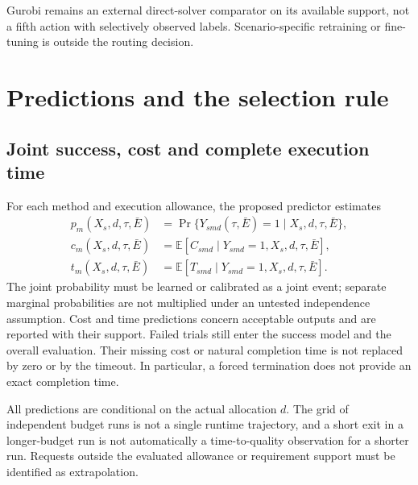 Gurobi remains an external direct-solver comparator on its available support,
not a fifth action with selectively observed labels. Scenario-specific
retraining or fine-tuning is outside the routing decision.

\section{Predictions and the selection rule}
\subsection{Joint success, cost and complete execution time}
For each method and execution allowance, the proposed predictor estimates
\begin{align}
 p_m(X_s,d,\tau,\bar E)
 &=\Pr\{Y_{smd}(\tau,\bar E)=1\mid X_s,d,\tau,\bar E\},\\
 c_m(X_s,d,\tau,\bar E)
 &=\mathbb E[C_{smd}\mid Y_{smd}=1,X_s,d,\tau,\bar E],\\
 t_m(X_s,d,\tau,\bar E)
 &=\mathbb E[T_{smd}\mid Y_{smd}=1,X_s,d,\tau,\bar E].
 \label{eq:prediction_targets}
\end{align}
The joint probability must be learned or calibrated as a joint event; separate
marginal probabilities are not multiplied under an untested independence
assumption. Cost and time predictions concern acceptable outputs and are
reported with their support. Failed trials still enter the success model and
the overall evaluation. Their missing cost or natural completion time is not
replaced by zero or by the timeout. In particular, a forced termination does
not provide an exact completion time.

All predictions are conditional on the actual allocation $d$. The grid of
independent budget runs is not a single runtime trajectory, and a short exit
in a longer-budget run is not automatically a time-to-quality observation
for a shorter run. Requests outside the evaluated allowance or requirement
support must be identified as extrapolation.

